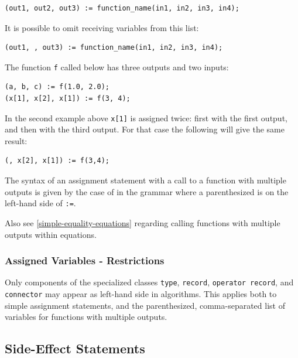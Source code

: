 \begin{lstlisting}[language=modelica]
(out1, out2, out3) := function_name(in1, in2, in3, in4);
\end{lstlisting}

It is possible to omit receiving variables from this list:
\begin{lstlisting}[language=modelica]
(out1, , out3) := function_name(in1, in2, in3, in4);
\end{lstlisting}

\begin{example}
The function \lstinline!f! called below has three outputs and two inputs:
\begin{lstlisting}[language=modelica]
(a, b, c) := f(1.0, 2.0);
(x[1], x[2], x[1]) := f(3, 4);
\end{lstlisting}
In the second example above \lstinline!x[1]! is assigned twice: first with the first output, and then with the third output.
For that case the following will give the same result:
\begin{lstlisting}[language=modelica]
(, x[2], x[1]) := f(3,4);
\end{lstlisting}
\end{example}

The syntax of an assignment statement with a call to a function with multiple outputs is given by the case of  in the grammar where a parenthesized  is on the left-hand side of \lstinline!:=!.

\begin{nonnormative}
Also see \cref{simple-equality-equations} regarding calling functions with multiple outputs within equations.
\end{nonnormative}


\subsubsection{Assigned Variables - Restrictions}\label{restrictions-on-assigned-variables}\label{assigned-variables-restrictions}

Only components of the specialized classes \lstinline!type!, \lstinline!record!, \lstinline!operator record!, and \lstinline!connector! may appear as left-hand side in algorithms.
This applies both to simple assignment statements, and the parenthesized, comma-separated list of variables for functions with multiple outputs.

\subsection{Side-Effect Statements}\label{side-effect-statements}

